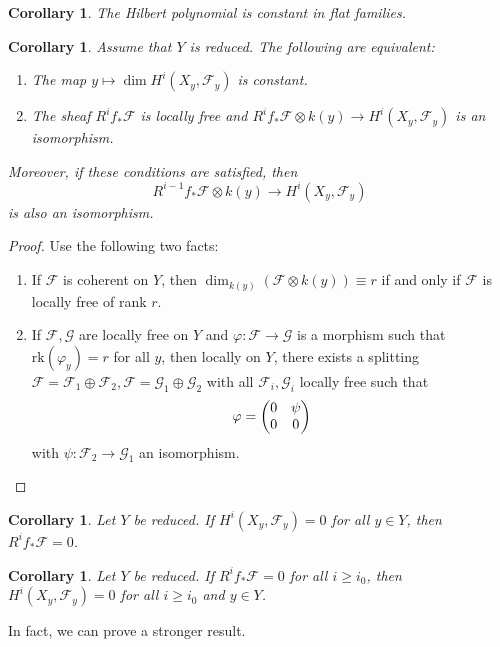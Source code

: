 \documentclass[leqno, openany]{memoir}
\newtheorem{cor}[thm]{Corollary}
\theoremstyle{definition}
\theoremstyle{remark}
\theoremstyle{plain}
\theoremstyle{definition}
\theoremstyle{remark}
\newcommand{\mc}[1]{\mathcal{#1}}
\newcommand{\mr}[1]{\mathrm{#1}}
\begin{document}
\begin{cor} The Hilbert polynomial is constant in flat families.  \end{cor}

\begin{cor} Assume that $Y$ is reduced. The following are equivalent:
    \begin{enumerate} \item The map $y \mapsto \dim H^i(X_y, \mc{F}_y)$ is
        constant.  \item The sheaf $R^i f_* \mc{F}$ is locally free and $R^i
        f_* \mc{F} \otimes k(y) \to H^i(X_y, \mc{F}_y)$ is an isomorphism.
    \end{enumerate} Moreover, if these conditions are satisfied, then \[
R^{i-1} f_* \mc{F} \otimes k(y) \to H^i(X_y, \mc{F}_y) \] is also an
isomorphism.  \end{cor}

\begin{proof} Use the following two facts: \begin{enumerate} \item If $\mc{F}$
    is coherent on $Y$, then $\dim_{k(y)} (\mc{F} \otimes k(y)) \equiv r$ if
    and only if $\mc{F}$ is locally free of rank $r$.  \item If $\mc{F},
    \mc{G}$ are locally free on $Y$ and $\varphi \colon \mc{F} \to \mc{G}$ is a
    morphism such that $\mr{rk}(\varphi_y) = r$ for all $y$, then locally on
    $Y$, there exists a splitting $\mc{F} = \mc{F}_1 \oplus \mc{F}_2, \mc{F} =
    \mc{G}_1 \oplus \mc{G}_2$ with all $\mc{F}_i, \mc{G}_i$ locally free such
    that \[ \varphi = \mqty( 0 & \psi \\ 0 & 0 ) \] with $\psi \colon \mc{F}_2
    \to \mc{G}_1$ an isomorphism. \qedhere \end{enumerate} \end{proof}

\begin{cor} Let $Y$ be reduced. If $H^i(X_y, \mc{F}_y) = 0$ for all $y \in Y$,
then $R^i f_* \mc{F} = 0$.  \end{cor}

\begin{cor} Let $Y$ be reduced. If $R^i f_* \mc{F} = 0$ for all $i \geq i_0$,
then $H^i(X_y, \mc{F}_y) = 0$ for all $i \geq i_0$ and $y \in Y$.  \end{cor}

In fact, we can prove a stronger result.
\end{document}
